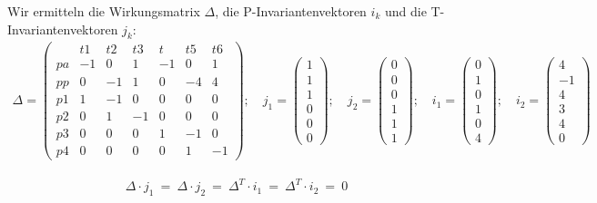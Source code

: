 \documentclass[12pt,a4paper]{../krautsourcing/homework}
\begin{document}
Wir ermitteln die Wirkungsmatrix \(\Delta\), die P-Invariantenvektoren \(i_k\) und die T-Invariantenvektoren \(j_k\):
\begin{align*}
    \Delta = \left( \begin{array}{c|cccccc}
        & t1 & t2 & t3 & t & t5 & t6 \\
        \hline
        pa & -1 & 0 & 1 & -1 & 0 & 1\\
        pp & 0 & -1 & 1 & 0 & -4 & 4\\
        p1 & 1 & -1 & 0 & 0 & 0 & 0\\
        p2 & 0 & 1 & -1 & 0 & 0 & 0\\
        p3 & 0 & 0 & 0 & 1 & -1 & 0\\
        p4 & 0 & 0 & 0 & 0 & 1 & -1
    \end{array} \right)
	; \quad
	j_{1} = \begin{pmatrix}
	1 \\ 1 \\ 1 \\ 0 \\0 \\0
	\end{pmatrix}
	;\quad
	j_{2} = \begin{pmatrix}
	0 \\ 0 \\ 0 \\ 1 \\1 \\1
	\end{pmatrix}
	; \quad
	i_1 = \begin{pmatrix}
	0\\1\\0\\1\\0\\4
	\end{pmatrix}
	; \quad
	i_2 = \begin{pmatrix}
	4\\-1\\4\\3\\4\\0
	\end{pmatrix}
\end{align*}

\begin{align*}
	\Delta \cdot j_1 \ = \ \Delta \cdot j_2 \ = \ \Delta^T \cdot i_1 \ = \ \Delta^T \cdot i_2 \ = \ 0
\end{align*}

\subsection{}
\end{document}

